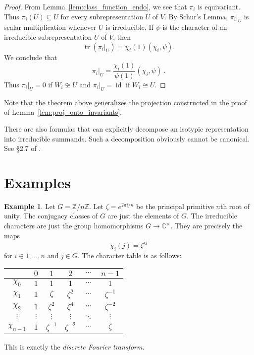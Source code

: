 \documentclass[12pt]{article}
\theoremstyle{plain}
\theoremstyle{definition}
\newtheorem{example}[theorem]{Example}
\theoremstyle{remark}
\numberwithin{equation}{section}
\begin{document}
\begin{proof}
From Lemma~\ref{lem:class_function_endo}, we see that
$\pi_i$ is equivariant.
Thus $\pi_i(U) \subseteq U$ for every subrepresentation $U$ of $V$.
By Schur's Lemma, $\pi_i|_U$ is scalar multiplication whenever
$U$ is irreducible.
If $\psi$ is the character of an irreducible subrepresentation $U$ of $V$,
then
\[
\operatorname{tr}(\pi_i|_U)=\chi_i(1) ( \chi_i, \psi ) .
\]
We conclude that
\[
\pi_i|_U = \frac{\chi_i(1)}{\psi(1)} ( \chi_i, \psi ) \ .
\]
Thus $\pi_i|_U=0$ if $W_i \not\cong U$ and $\pi_i|_U=\operatorname{id}$
if $W_i \cong U$.
\end{proof}

Note that the theorem above generalizes the projection constructed in
the proof of Lemma~\ref{lem:proj_onto_invariants}.

There are also formulas that can explicitly decompose an
isotypic representation into irreducible summands.
Such a decomposition obviously cannot be canonical.
See \S 2.7 of \cite{Serre}.

\section{Examples}

\begin{example}
Let $G = \mathbb{Z}/n\mathbb{Z}$.  Let $\zeta = e^{2\pi i/n}$
be the principal primitive $n$th root of unity.
The conjugacy classes of $G$ are just the elements of $G$.
The irreducible characters are just
the group homomorphisms $G \to \mathbb{C}^\times$.
They are precisely the maps
\[
\chi_i(j) = \zeta^{ij}
\]
for $i \in 1,\ldots,n$ and $j \in G$.
The character table is as follows:
\begin{center}
\begin{tabular}{|c|c|c|c|c|c|}
\hline 
 & $0 $ & $1$ & $2$ & $\cdots$ & ${n-1}$\\
\hline 
\hline 
$\chi_0$ & $1$ & $1$ & $1$ & $\cdots$ & $1$\\
\hline 
$\chi_1$ & $1$ & $\zeta$ & $\zeta^2$ & $\cdots$ & $\zeta^{-1}$\\
\hline 
$\chi_2$ & $1$ & $\zeta^2$ & $\zeta^4$ & $\cdots$ & $\zeta^{-2}$\\
\hline 
$\vdots$ & $\vdots$ & $\vdots$ & $\vdots$ & $\ddots$ & $\vdots$\\
\hline 
$\chi_{n-1}$ & $1$ & $\zeta^{-1}$ & $\zeta^{-2}$ & $\cdots$ & $\zeta$\\
\hline
\end{tabular}
\end{center}
This is exactly the \emph{discrete Fourier transform}.
\end{example}
\end{document}
